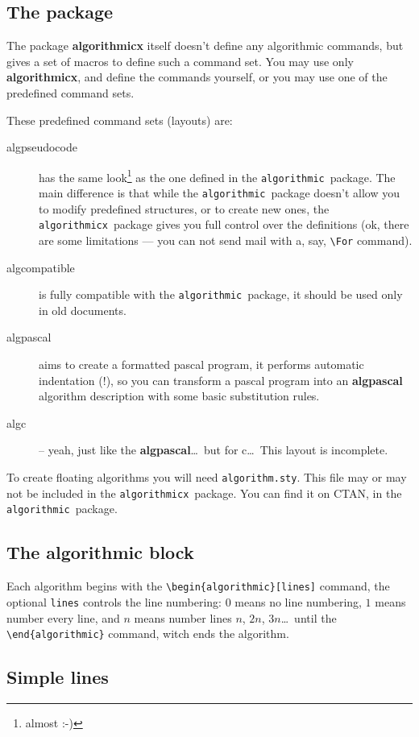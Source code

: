 \documentclass{jsarticle}
\newcommand{\alg}{\texttt{algorithmicx}}
\newcommand{\old}{\texttt{algorithmic}}
\begin{document}
\subsection{The package}
The package \textbf{algorithmicx} itself doesn't define any algorithmic commands, but gives 
a set of macros to define such a command set. You may use only \textbf{algorithmicx}, and define 
the commands yourself, or you may use one of the predefined command sets.

These predefined command sets (layouts) are:
\begin{description}
\item[algpseudocode] has the same look\footnote{almost :-)} as the one defined in the
\old\ package. The main difference is that while the \old\ package doesn't 
allow you to modify predefined structures, or to create new ones, the \alg\ 
package gives you full control over the definitions (ok, there are some 
limitations --- you can not send mail with a, say, \verb:\For: command).
\item[algcompatible] is fully compatible with the \old\ package, it should be
used only in old documents.
\item[algpascal] aims to create a formatted pascal program, it performs 
automatic indentation (!), so you can transform a pascal program into an 
\textbf{algpascal} algorithm description with some basic substitution rules.
\item[algc] -- yeah, just like the \textbf{algpascal}\dots\ but for c\dots\ 
This layout is incomplete.
\end{description}

To create floating algorithms you will need \verb:algorithm.sty:. This file may or may not be
included in the \alg\ package. You can find it on CTAN, in the \old\ package.



\subsection{The algorithmic block}
Each algorithm begins with the \verb:\begin{algorithmic}[lines]: command, the 
optional \verb:lines: controls the line numbering: $0$ means no line numbering, 
$1$ means number every line, and $n$ means number lines $n$, $2n$, $3n$\dots\ until the
\verb:\end{algorithmic}: command, witch ends the algorithm.



\subsection{Simple lines}
\end{document}
